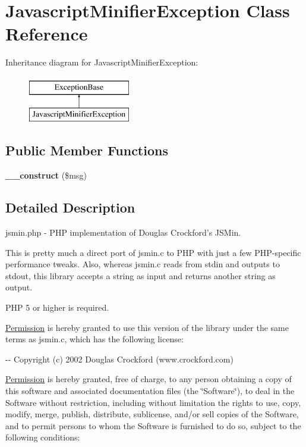 \hypertarget{classJavascriptMinifierException}{
\section{JavascriptMinifierException Class Reference}
\label{classJavascriptMinifierException}
}
Inheritance diagram for JavascriptMinifierException:\begin{figure}[H]
\begin{center}
\leavevmode
\includegraphics[height=2.000000cm]{classJavascriptMinifierException}
\end{center}
\end{figure}
\subsection*{Public Member Functions}
\begin{DoxyCompactItemize}
\item 
\hypertarget{classJavascriptMinifierException_a964dceaf8a829da849a7e47d35525260}{
{\bfseries \_\-\_\-construct} (\$msg)}
\label{classJavascriptMinifierException_a964dceaf8a829da849a7e47d35525260}

\end{DoxyCompactItemize}


\subsection{Detailed Description}
jsmin.php -\/ PHP implementation of Douglas Crockford's JSMin.

This is pretty much a direct port of jsmin.c to PHP with just a few PHP-\/specific performance tweaks. Also, whereas jsmin.c reads from stdin and outputs to stdout, this library accepts a string as input and returns another string as output.

PHP 5 or higher is required.

\hyperlink{classPermission}{Permission} is hereby granted to use this version of the library under the same terms as jsmin.c, which has the following license:

-\/-\/ Copyright (c) 2002 Douglas Crockford (www.crockford.com)

\hyperlink{classPermission}{Permission} is hereby granted, free of charge, to any person obtaining a copy of this software and associated documentation files (the \char`\"{}Software\char`\"{}), to deal in the Software without restriction, including without limitation the rights to use, copy, modify, merge, publish, distribute, sublicense, and/or sell copies of the Software, and to permit persons to whom the Software is furnished to do so, subject to the following conditions:

